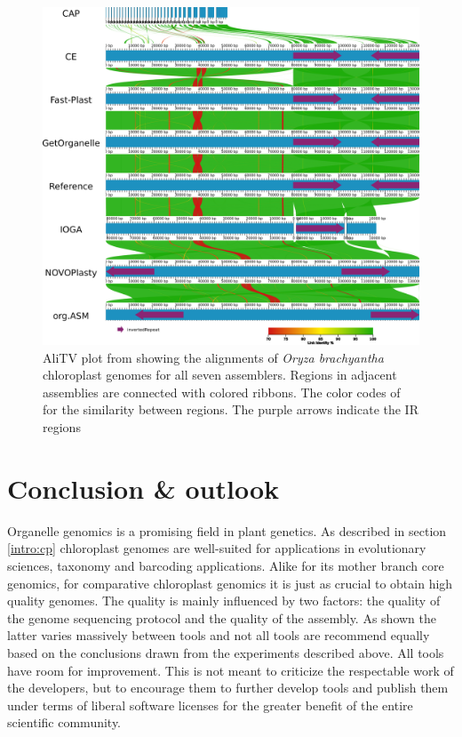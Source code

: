 \begin{figure}[H]
  \centering \includegraphics[height=.60\textheight, width=.99\textwidth]{Figures/AliTV.png} \decoRule
  \caption[AliTV plot of alignments of assemblies of \textit{Oryza brachyantha} from all
  assemblers]{ AliTV plot \cite{alitv} from \cite{freudenthal2019landscape} showing the
    alignments of \textit{Oryza brachyantha} chloroplast genomes for all seven
    assemblers. Regions in adjacent assemblies are connected with colored ribbons. The
    color codes of for the similarity between regions. The purple arrows indicate the IR
    regions}
\label{fig:alitv}
\end{figure}

\section{Conclusion \& outlook}

Organelle genomics is a promising field in plant genetics. As described in section
\ref{intro:cp} chloroplast genomes are well-suited for applications in evolutionary
sciences, taxonomy and barcoding applications. Alike for its mother branch core genomics,
for comparative chloroplast genomics it is just as crucial to obtain high quality
genomes. The quality is mainly influenced by two factors: the quality of the genome
sequencing protocol and the quality of the assembly. As shown the latter varies massively
between tools and not all tools are recommend equally based on the conclusions drawn from the
experiments described above. All tools have room for improvement. This is not meant to
criticize the respectable work of the developers, but to encourage them to further develop
tools and publish them under terms of liberal software licenses for the greater benefit of
the entire scientific community.
